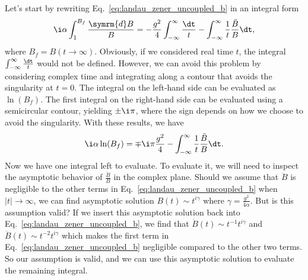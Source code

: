 Let's start by rewriting Eq.~\eqref{eq:landau_zener_uncoupled_b} in an integral form
\begin{equation}
\i\alpha\int_1^{B_f}\frac{\symrm{d}B}{B}=-\frac{g^2}{4}\int_{-\infty}^\infty\frac{\dt}{t}-\int_{-\infty}^\infty\frac{1}{t}\frac{\ddot B}{B}\dt,
\end{equation}
where $B_f=B(t\to\infty)$. Obviously, if we considered real time $t$, the integral $\int_{-\infty}^\infty\frac{\dt}{t}$ would not be defined. However, we can avoid this problem by considering complex time and integrating along a contour that avoids the singularity at $t=0$. The integral on the left-hand side can be evaluated as $\ln(B_f)$. The first integral on the right-hand side can be evaluated using a semicircular contour, yielding $\pm \i\pi$, where the sign depends on how we choose to avoid the singularity. With these results, we have
\begin{equation}
\i\alpha\ln(B_f)=\mp\i\pi\frac{g^2}{4}-\int_{-\infty}^\infty\frac{1}{t}\frac{\ddot B}{B}\dt.
\end{equation}
Now we have one integral left to evaluate. To evaluate it, we will need to inspect the asymptotic behavior of $\frac{\ddot B}{B}$ in the complex plane. Should we assume that $\ddot B$ is negligible to the other terms in Eq.~\eqref{eq:landau_zener_uncoupled_b} when $\lvert t\rvert\to\infty$, we can find asymptotic solution $B(t)\sim t^{i\gamma}$ where $\gamma=\frac{g^2}{4\alpha}$. But is this assumption valid? If we insert this asymptotic solution back into Eq.~\eqref{eq:landau_zener_uncoupled_b}, we find that $\dot B(t)\sim t^{-1}t^{i\gamma}$ and $\ddot B(t)\sim t^{-2}t^{i\gamma}$ which makes the first term in Eq.~\eqref{eq:landau_zener_uncoupled_b} negligible compared to the other two terms. So our assumption is valid, and we can use this asymptotic solution to evaluate the remaining integral.

